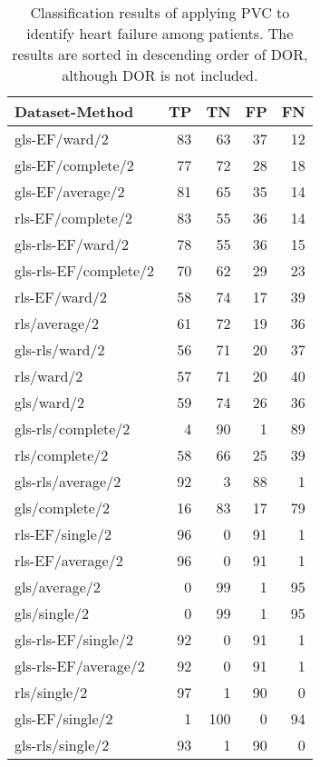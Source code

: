\begin{longtable}{lrrrr}
    \caption{Classification results of applying PVC to identify heart failure among patients.
             The results are sorted in descending order of DOR, although DOR is not included.}
    \label{tab:pvc_hf_raw_results}\\
    \hline
    Dataset-Method        &     TP &    TN &    FP &    FN \\
    \hline
    gls-EF/ward/2         & 83 &  63 & 37 & 12 \\
    gls-EF/complete/2     & 77 &  72 & 28 & 18 \\
    gls-EF/average/2      & 81 &  65 & 35 & 14 \\
    rls-EF/complete/2     & 83 &  55 & 36 & 14 \\
    gls-rls-EF/ward/2     & 78 &  55 & 36 & 15 \\
    gls-rls-EF/complete/2 & 70 &  62 & 29 & 23 \\
    rls-EF/ward/2         & 58 &  74 & 17 & 39 \\
    rls/average/2         & 61 &  72 & 19 & 36 \\
    gls-rls/ward/2        & 56 &  71 & 20 & 37 \\
    rls/ward/2            & 57 &  71 & 20 & 40 \\
    gls/ward/2            & 59 &  74 & 26 & 36 \\
    gls-rls/complete/2    &  4 &  90 &  1 & 89 \\
    rls/complete/2        & 58 &  66 & 25 & 39 \\
    gls-rls/average/2     & 92 &   3 & 88 &  1 \\
    gls/complete/2        & 16 &  83 & 17 & 79 \\
    rls-EF/single/2       & 96 &   0 & 91 &  1 \\
    rls-EF/average/2      & 96 &   0 & 91 &  1 \\
    gls/average/2         &  0 &  99 &  1 & 95 \\
    gls/single/2          &  0 &  99 &  1 & 95 \\
    gls-rls-EF/single/2   & 92 &   0 & 91 &  1 \\
    gls-rls-EF/average/2  & 92 &   0 & 91 &  1 \\
    rls/single/2          & 97 &   1 & 90 &  0 \\
    gls-EF/single/2       &  1 & 100 &  0 & 94 \\
    gls-rls/single/2      & 93 &   1 & 90 &  0 \\
    \hline
\end{longtable}

